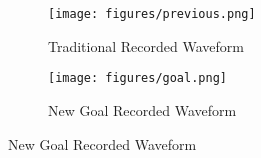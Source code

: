 \begin{figure}[H]
\begin{minipage}{.5\textwidth}
\begin{figure}[H]
    \centering
    \caption{Traditional Recorded Waveform}
    \texttt{[image: figures/previous.png]}
    \label{fig:tradi}
\end{figure}
\end{minipage}
\begin{minipage}{.5\textwidth}
\begin{figure}[H]
    \centering
    \caption{New Goal Recorded Waveform}
    \texttt{[image: figures/goal.png]}
    \label{fig:new}
\end{figure}
\end{minipage}
\end{figure}

